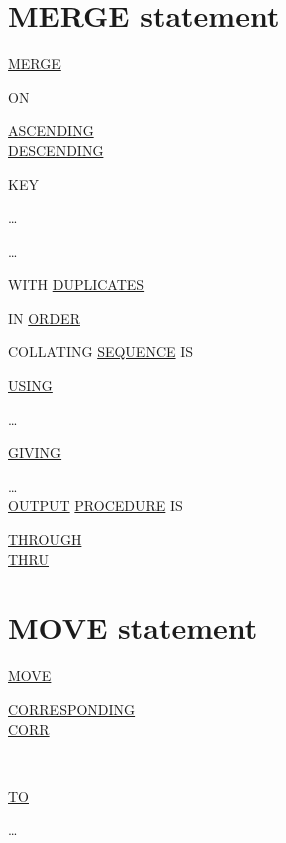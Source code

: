 \documentclass[a4paper,oneside,svgnames]{scrbook}
\makeatletter
\newcommand{\key}[1]{\underline{#1}}
\newenvironment{0-1}{$\left[ \begin{tabular}{@{}l@{}}}{\end{tabular} \right]$}
\newenvironment{1=}{$\left\{ \begin{tabular}{@{}l@{}}}{\end{tabular} \right\}$}
\makeatother
\begin{document}
\section{MERGE statement}

\key{MERGE} \identifier
\begin{0-1}
  ON
  \begin{1=}
    \key{ASCENDING} \\
    \key{DESCENDING}
  \end{1=}
  KEY
  \begin{0-1}
    \identifier
  \end{0-1}\ldots
\end{0-1} \ldots

\begin{0-1}
  WITH \key{DUPLICATES}
  \begin{0-1}
    IN \key{ORDER}
  \end{0-1}
\end{0-1}

\begin{0-1}
  COLLATING \key{SEQUENCE} IS \identifier
\end{0-1}

\begin{0-1}
  \key{USING}
  \begin{1=}
    \filename
  \end{1=}\ldots
\end{0-1}

\begin{0-1}
  \key{GIVING}
  \begin{1=}
    \filename
  \end{1=}\ldots \\

  \key{OUTPUT} \key{PROCEDURE} IS
  \procedurename
  \begin{0-1}
    \begin{1=}
      \key{THROUGH} \\
      \key{THRU}
    \end{1=}
    \procedurename
  \end{0-1}
\end{0-1}

\section{MOVE statement}

\key{MOVE}
\begin{0-1}
  \key{CORRESPONDING} \\
  \key{CORR}
\end{0-1}
\begin{1=}
  \identifier \\
  \literal
\end{1=}
\key{TO}
\begin{1=}
  \identifier
\end{1=} \ldots
\end{document}
